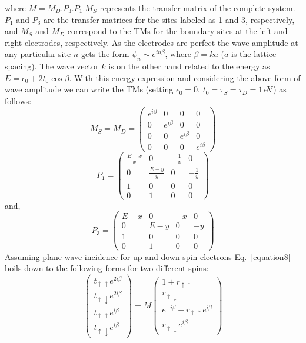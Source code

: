 \documentclass[doublecol]{epl2}
\begin{document}
where $M=M_D.P_3.P_1.M_S$ represents the transfer matrix of the complete 
system. $P_1$ and $P_3$ are the transfer matrices for the sites labeled 
as 1 and 3, respectively, and $M_S$ and $M_D$ correspond to the TMs for
the boundary sites at the left and right electrodes, respectively.
As the electrodes are perfect the wave amplitude at any particular site 
$n$ gets the form $\psi_n\sim e^{in\beta}$, where $\beta=ka$ ($a$ is
the lattice spacing). The wave vector $k$ is on the other hand related 
to the energy as $E=\epsilon_0 + 2 t_0 \cos{\beta}$. With this energy 
expression and considering the above form of wave amplitude we can write
the TMs (setting $\epsilon_0=0$, $t_0=\tau_S=\tau_D=1\,$eV) as follows:
$$M_S=M_D=\left(\begin{array}{cccc}
    e^{i\beta} & 0 & 0 & 0 \\ 
    0 & e^{i\beta} & 0 & 0 \\
    0 & 0 & e^{i\beta} & 0 \\
    0 & 0 & 0 & e^{i\beta}
\end{array}\right)$$
$$P_1=\left(\begin{array}{cccc}
    \frac{E-x}{x} & 0 & -\frac{1}{x} & 0 \\ 
    0 & \frac{E-y}{y} & 0 & -\frac{1}{y} \\
    1 & 0 & 0 & 0 \\
    0 & 1 & 0 & 0
\end{array}\right)$$
and,
$$P_3=\left(\begin{array}{cccc}
    E-x & 0 & -x & 0 \\ 
    0 & E-y & 0 & -y \\
    1 & 0 & 0 & 0 \\
    0 & 1 & 0 & 0
\end{array}\right)$$
Assuming plane wave incidence for up and down spin electrons 
Eq.~\ref{equation8} boils down to the following forms for two different 
spins:
\begin{equation}
\left(\begin{array}{cc}
    t_{\uparrow\uparrow}e^{2 i \beta} \\
    t_{\uparrow\downarrow} e^{2 i \beta}\\ 
    t_{\uparrow\uparrow}e^{i \beta} \\
    t_{\uparrow\downarrow} e^{i \beta}
\end{array}\right)
=M\left(\begin{array}{cc}
    1 + r_{\uparrow\uparrow} \\ 
    r_{\uparrow\downarrow}\\
    e^{-i\beta} + r_{\uparrow\uparrow}  e^{i\beta}\\
    r_{\uparrow\downarrow} e^{i \beta} 
\end{array}\right)
\label{eq16}
\end{equation}
\end{document}
